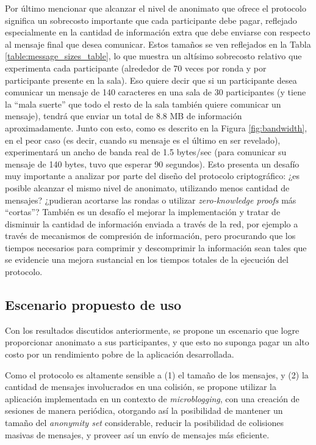 Por último mencionar que alcanzar el nivel de anonimato 
que ofrece el protocolo significa un sobrecosto importante que cada 
participante debe pagar, reflejado especialmente en la cantidad de 
información extra que debe enviarse con respecto al mensaje final que 
desea comunicar. Estos tamaños se ven reflejados en la Tabla 
\ref{table:message_sizes_table}, lo que muestra un altísimo sobrecosto 
relativo que experimenta cada participante (alrededor de 70 veces por 
ronda y por participante presente en la sala). Eso quiere decir que si un 
participante desea comunicar un mensaje de 140 caracteres en una sala de 
30 participantes (y tiene la ``mala suerte'' que todo el resto de la sala 
también quiere comunicar un mensaje), tendrá que enviar un total de 8.8 MB 
de información aproximadamente. Junto con esto, como es descrito en la Figura 
\ref{fig:bandwidth}, en el peor caso (es decir, 
cuando su mensaje es el último en ser revelado), experimentará un ancho de 
banda real de 1.5 bytes/sec (para comunicar su mensaje de 140 bytes, tuvo 
que esperar 90 segundos). Esto presenta un desafío muy importante a 
analizar por parte del diseño del protocolo criptográfico: ¿es posible 
alcanzar el mismo nivel de anonimato, utilizando menos cantidad de 
mensajes? ¿pudieran acortarse las rondas o utilizar 
\emph{zero-knowledge proofs} más ``cortas''? También es un desafío el 
mejorar la implementación y tratar de disminuir la cantidad de información 
enviada a través de la red, por ejemplo a través de mecanismos de 
compresión de información, pero procurando que los tiempos necesarios para 
comprimir y descomprimir la información sean tales que se evidencie una 
mejora sustancial en los tiempos totales de la ejecución del protocolo.

\subsection{Escenario propuesto de uso}

Con los resultados discutidos anteriormente, se propone un escenario que logre 
proporcionar anonimato a sus participantes, y que esto no suponga pagar un 
alto costo por un rendimiento pobre de la aplicación desarrollada.

Como el protocolo es altamente sensible a (1) el tamaño de los mensajes, y (2) 
la cantidad de mensajes involucrados en una colisión, se propone utilizar la 
aplicación implementada en un contexto de \emph{microblogging}, con una 
creación de sesiones de manera periódica, otorgando así la posibilidad de 
mantener un tamaño del \emph{anonymity set} considerable, reducir la 
posibilidad de colisiones masivas de mensajes, y proveer así un envío de 
mensajes más eficiente.

